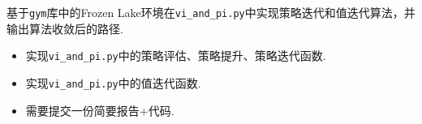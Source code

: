 基于\texttt{gym}库中的Frozen Lake环境在\texttt{vi\_and\_pi.py}中实现策略迭代和值迭代算法，并输出算法收敛后的路径.

\begin{itemize}
    \item 实现\texttt{vi\_and\_pi.py}中的策略评估、策略提升、策略迭代函数.
    \item 实现\texttt{vi\_and\_pi.py}中的值迭代函数.
    \item 需要提交一份简要报告+代码.
\end{itemize}